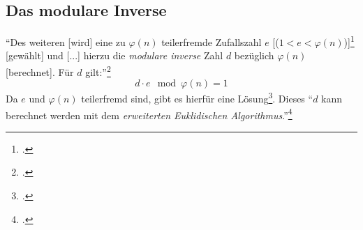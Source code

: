 \documentclass{scrarticle}
\begin{document}
        \subsection{Das modulare Inverse} %
            \enquote{Des weiteren [wird] eine zu $\varphi(n)$ teilerfremde Zufallszahl $e$ [($1<e<\varphi(n)$)]\footcite[71]{watjen2008} [gewählt] und [...] hierzu die \emph{modulare inverse} Zahl $d$ bezüglich $\varphi(n)$ [berechnet]. Für $d$ gilt:}\footcite[279]{dankmeier2006}
            \begin{equation}
                d\cdot e\mod{\varphi(n)} = 1 \label{eq:modinv}
            \end{equation}
            Da $e$ und $\varphi(n)$ teilerfremd sind, gibt es hierfür eine Lösung\footcite[vgl.][77, 164]{ertel2003}. Dieses
            \enquote{$d$ kann berechnet werden mit dem \emph{erweiterten Euklidischen Algorithmus}.}\footcite[77]{ertel2003}
\end{document}
